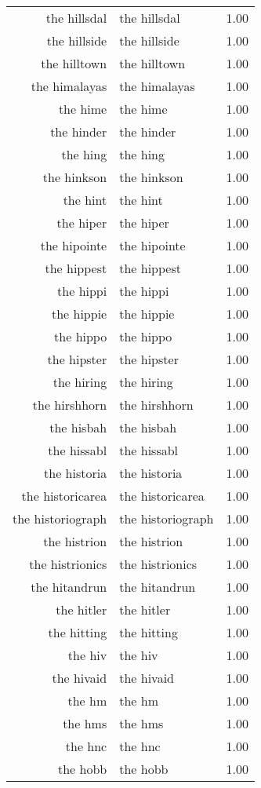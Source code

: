 \begin{table}[ht]
\begin{tabular}{rlr}
  the hillsdal & the hillsdal & 1.00 \\ 
  the hillside & the hillside & 1.00 \\ 
  the hilltown & the hilltown & 1.00 \\ 
  the himalayas & the himalayas & 1.00 \\ 
  the hime & the hime & 1.00 \\ 
  the hinder & the hinder & 1.00 \\ 
  the hing & the hing & 1.00 \\ 
  the hinkson & the hinkson & 1.00 \\ 
  the hint & the hint & 1.00 \\ 
  the hiper & the hiper & 1.00 \\ 
  the hipointe & the hipointe & 1.00 \\ 
  the hippest & the hippest & 1.00 \\ 
  the hippi & the hippi & 1.00 \\ 
  the hippie & the hippie & 1.00 \\ 
  the hippo & the hippo & 1.00 \\ 
  the hipster & the hipster & 1.00 \\ 
  the hiring & the hiring & 1.00 \\ 
  the hirshhorn & the hirshhorn & 1.00 \\ 
  the hisbah & the hisbah & 1.00 \\ 
  the hissabl & the hissabl & 1.00 \\ 
  the historia & the historia & 1.00 \\ 
  the historicarea & the historicarea & 1.00 \\ 
  the historiograph & the historiograph & 1.00 \\ 
  the histrion & the histrion & 1.00 \\ 
  the histrionics & the histrionics & 1.00 \\ 
  the hitandrun & the hitandrun & 1.00 \\ 
  the hitler & the hitler & 1.00 \\ 
  the hitting & the hitting & 1.00 \\ 
  the hiv & the hiv & 1.00 \\ 
  the hivaid & the hivaid & 1.00 \\ 
  the hm & the hm & 1.00 \\ 
  the hms & the hms & 1.00 \\ 
  the hnc & the hnc & 1.00 \\ 
  the hobb & the hobb & 1.00 \\ 

\end{tabular}
\end{table}
